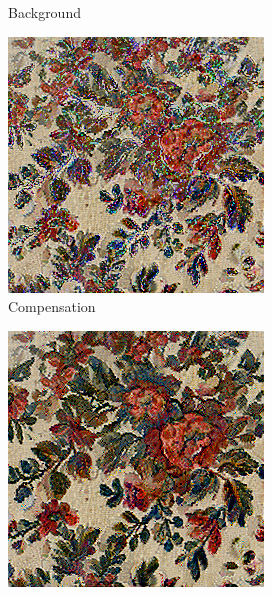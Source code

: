 \begin{figure}[]
\begin{subfigure}{\textwidth}
\begin{subfigure}{0.24\textwidth}
            \caption*{Background}
        \end{subfigure}
        \hfill
        \begin{subfigure}{0.24\textwidth}
            \centering
            \includegraphics[width=\textwidth]{images/04-experiment01/flowers/1000/threshold_im.jpg}
            \caption*{Compensation}
        \end{subfigure}
        \hfill
        \begin{subfigure}{0.24\textwidth}
            \centering
            \includegraphics[width=\textwidth]{images/04-experiment01/flowers/1000/threshold_proj.jpg}

\end{subfigure}
\end{subfigure}
\end{figure}
